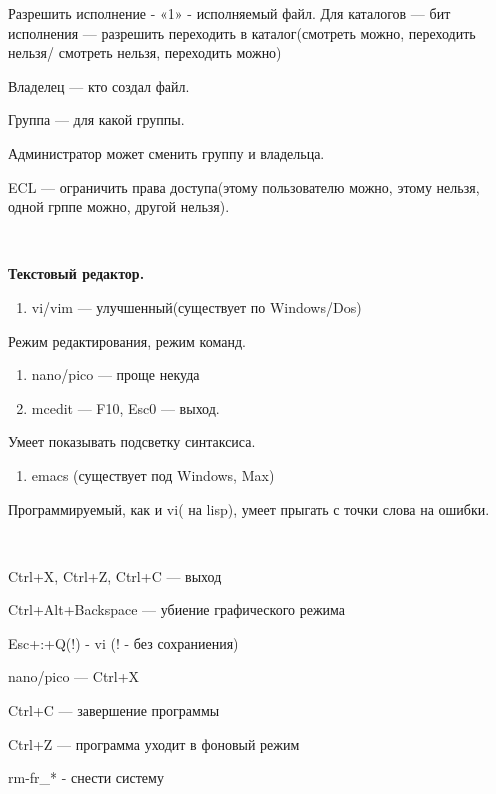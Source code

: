 \par 
Разрешить исполнение - «1» - исполняемый
файл. Для каталогов — бит исполнения —
разрешить переходить в каталог(смотреть
можно, переходить нельзя/ смотреть
нельзя, переходить можно)
\par 
Владелец — кто создал файл.
\par 
Группа — для какой группы.
\par 
Администратор может сменить группу и
владельца.
\par 
ECL — ограничить права доступа(этому
пользователю можно, этому нельзя, одной
грппе можно, другой нельзя).
\par 
\\

\par 
\textbf{Текстовый редактор.}
\begin{enumerate}
	\item \par 
	vi/vim — улучшенный(существует по
	Windows/Dos)
\end{enumerate}
\par 
Режим редактирования, режим команд.
\begin{enumerate}
	\item \par 
	nano/pico — проще некуда
	\item \par 
	mcedit — F10, Esc0 — выход.
\end{enumerate}
\par 
Умеет показывать подсветку синтаксиса.
\begin{enumerate}
	\item \par 
	emacs (существует под Windows, Max)
\end{enumerate}
\par 
Программируемый, как и vi( на lisp), умеет
прыгать с точки слова на ошибки.
\par 
\\

\par 
  

\par 
Ctrl+X, Ctrl+Z, Ctrl+C — выход 

\par 
Ctrl+Alt+Backspace — убиение графического режима
\par 
Esc+:+Q(!) - vi (! - без сохраниения)
\par 
nano/pico — Ctrl+X 

\par 
Ctrl+C — завершение программы
\par 
Ctrl+Z — программа уходит в фоновый режим
\par 
rm-fr\_* - снести систему 


